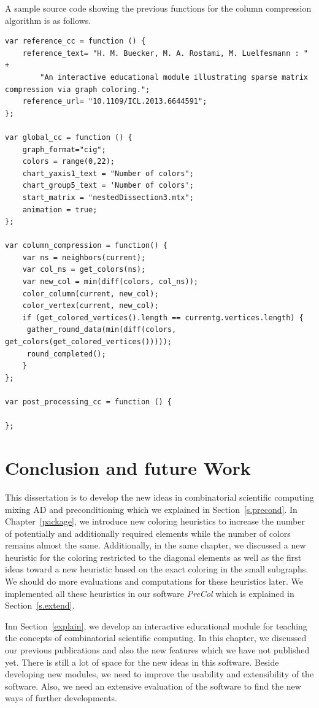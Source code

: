 \documentclass[12pt, twoside,a4paper,toc=bibliography]{scrbook}
\newcommand{\secref}[1]{Section~\protect\ref{#1}}
\begin{document}
A sample source code showing the previous functions for the column compression algorithm is as follows.
\begin{lstlisting}
var reference_cc = function () {
    reference_text= "H. M. Buecker, M. A. Rostami, M. Luelfesmann : " +
        "An interactive educational module illustrating sparse matrix compression via graph coloring.";
    reference_url= "10.1109/ICL.2013.6644591";
};

var global_cc = function () {
    graph_format="cig";
    colors = range(0,22);
    chart_yaxis1_text = "Number of colors";
    chart_group5_text = 'Number of colors';
    start_matrix = "nestedDissection3.mtx";
    animation = true;
};

var column_compression = function() {
    var ns = neighbors(current);
    var col_ns = get_colors(ns);
    var new_col = min(diff(colors, col_ns));
    color_column(current, new_col);
    color_vertex(current, new_col);
    if (get_colored_vertices().length == currentg.vertices.length) {
     gather_round_data(min(diff(colors, get_colors(get_colored_vertices()))));
     round_completed();
    }
};

var post_processing_cc = function () {

};
\end{lstlisting}

\chapter{Conclusion and future Work}
\label{conc}
This dissertation is to develop the new ideas in combinatorial scientific computing mixing AD and preconditioning which we explained in \secref{s.precond}.
In Chapter~\ref{package}, we introduce new coloring heuristics
to increase the number of potentially and additionally required elements
while the number of colors remains almost the same.
Additionally, in the same chapter,
we discussed a new heuristic for the coloring restricted to the diagonal elements
as well as the first ideas toward a new heuristic based on the exact coloring in the small subgraphs.
We should do more evaluations and computations for these heuristics later.
We implemented all these heuristics in our software \textit{PreCol} which 
is explained in \secref{s.extend}.

Inn \secref{explain}, we develop an interactive educational module 
for teaching the concepts of combinatorial scientific computing. 
In this chapter, we discussed our previous publications
\cite{2013:05,2014:01,2014:02,2014:09,2015:3} and also the new features which 
we have not published yet. There is still a lot of space 
for the new ideas in this software. Beside developing new modules,
we need to improve the usability and extensibility of the software.
Also, we need an extensive evaluation of the software to find
the new ways of further developments.
\end{document}
